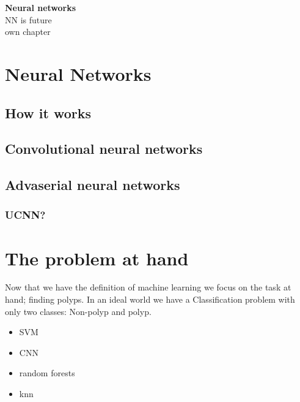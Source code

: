 	  
	  \vspace{5px}
	  \textbf{Neural networks}\\
	  NN is future\\
	  own chapter\\
	  
	
	\section{Neural Networks}
	  
	  
	  \subsection{How it works}
	
	  
	  \subsection{Convolutional neural networks}
	  
	  \subsection{Advaserial neural networks}
	  
	  
	  
	  \subsubsection{UCNN?}
	  
	  
	  
	\section{The problem at hand}
	  Now that we have the definition of machine learning we focus on the task at hand; finding polyps. In an ideal world we have a
	  Classification problem with only two classes: Non-polyp and polyp. 
	  
	  \begin{itemize}
	    \item SVM 
	    \item CNN 
	    \item random forests
	    \item knn
	  \end{itemize}
	  
	
	